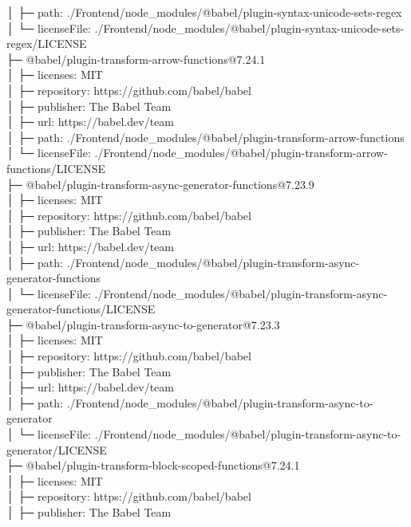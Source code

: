 \documentclass[
    paper=a4,
    twoside=false,
    parskip=half,
    listof=entryprefix,
    listof=totoc,
    index=totoc,
    bibliography=totoc,
    headsepline,
]{scrbook}
\begin{document}
    │  ├─ path: ./Frontend/node\_modules/@babel/plugin-syntax-unicode-sets-regex\\
    │  └─ licenseFile: ./Frontend/node\_modules/@babel/plugin-syntax-unicode-sets-regex/LICENSE\\
    ├─ @babel/plugin-transform-arrow-functions@7.24.1\\
    │  ├─ licenses: MIT\\
    │  ├─ repository: https://github.com/babel/babel\\
    │  ├─ publisher: The Babel Team\\
    │  ├─ url: https://babel.dev/team\\
    │  ├─ path: ./Frontend/node\_modules/@babel/plugin-transform-arrow-functions\\
    │  └─ licenseFile: ./Frontend/node\_modules/@babel/plugin-transform-arrow-functions/LICENSE\\
    ├─ @babel/plugin-transform-async-generator-functions@7.23.9\\
    │  ├─ licenses: MIT\\
    │  ├─ repository: https://github.com/babel/babel\\
    │  ├─ publisher: The Babel Team\\
    │  ├─ url: https://babel.dev/team\\
    │  ├─ path: ./Frontend/node\_modules/@babel/plugin-transform-async-generator-functions\\
    │  └─ licenseFile: ./Frontend/node\_modules/@babel/plugin-transform-async-generator-functions/LICENSE\\
    ├─ @babel/plugin-transform-async-to-generator@7.23.3\\
    │  ├─ licenses: MIT\\
    │  ├─ repository: https://github.com/babel/babel\\
    │  ├─ publisher: The Babel Team\\
    │  ├─ url: https://babel.dev/team\\
    │  ├─ path: ./Frontend/node\_modules/@babel/plugin-transform-async-to-generator\\
    │  └─ licenseFile: ./Frontend/node\_modules/@babel/plugin-transform-async-to-generator/LICENSE\\
    ├─ @babel/plugin-transform-block-scoped-functions@7.24.1\\
    │  ├─ licenses: MIT\\
    │  ├─ repository: https://github.com/babel/babel\\
    │  ├─ publisher: The Babel Team\\
\end{document}
